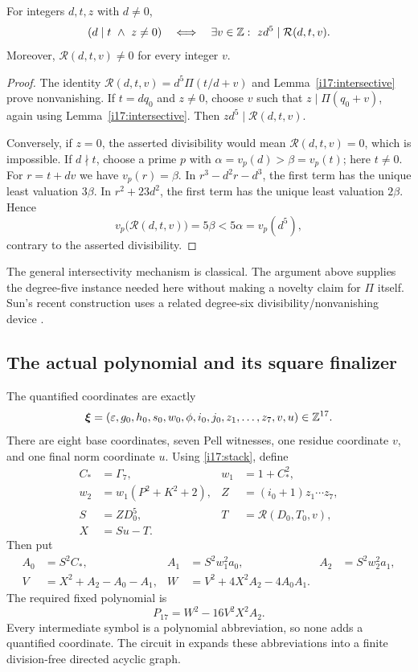 \begin{lemma}
\label{i17:merge}
For integers $d,t,z$ with $d\ne0$,
\begin{equation}
 (d\mid t\ \land\ z\ne0)
 \quad\Longleftrightarrow\quad
 \exists v\in\mathbb Z:\ zd^5\mid\mathcal R(d,t,v).
 \label{i17:merge-equivalence}
\end{equation}
Moreover, $\mathcal R(d,t,v)\ne0$ for every integer $v$.
\end{lemma}
\begin{proof}
The identity
$\mathcal R(d,t,v)=d^5\Pi(t/d+v)$ and
Lemma~\ref{i17:intersective} prove nonvanishing.
If $t=dq_0$ and $z\ne0$, choose $v$ such that
$z\mid\Pi(q_0+v)$, again using Lemma~\ref{i17:intersective}.
Then $zd^5\mid\mathcal R(d,t,v)$.

Conversely, if $z=0$, the asserted divisibility would mean
$\mathcal R(d,t,v)=0$, which is impossible.
If $d\nmid t$, choose a prime $p$ with
$\alpha=v_p(d)>\beta=v_p(t)$; here $t\ne0$.
For $r=t+dv$ we have $v_p(r)=\beta$.
In $r^3-d^2r-d^3$, the first term has the unique least valuation
$3\beta$. In $r^2+23d^2$, the first term has the unique least
valuation $2\beta$. Hence
\[
 v_p\bigl(\mathcal R(d,t,v)\bigr)
 =5\beta<5\alpha=v_p(d^5),
\]
contrary to the asserted divisibility.
\end{proof}

The general intersectivity mechanism is classical. The argument above
supplies the degree-five instance needed here without making a novelty
claim for $\Pi$ itself. Sun's recent construction uses a related
degree-six divisibility/nonvanishing device \cite[Section 5]{sun2026}.

\subsection{The actual polynomial and its square finalizer}

The quantified coordinates are exactly
\[
 \boldsymbol\xi=
 (\varepsilon,g_0,h_0,s_0,w_0,\phi,i_0,j_0,
   z_1,\ldots,z_7,v,u)\in\mathbb Z^{17}.
\]
There are eight base coordinates, seven Pell witnesses, one residue
coordinate $v$, and one final norm coordinate $u$.
Using \eqref{i17:stack}, define
\begin{align*}
 C_\ast&=\Gamma_7,& w_1&=1+C_\ast^2,\\
 w_2&=w_1(P^2+K^2+2),& Z&=(i_0+1)z_1\cdots z_7,\\
 S&=ZD_0^5,& T&=\mathcal R(D_0,T_0,v),\\
 X&=Su-T.
\end{align*}
Then put
\begin{align*}
 A_0&=S^2C_\ast,&
 A_1&=S^2w_1^2a_0,&
 A_2&=S^2w_2^2a_1,\\
 V&=X^2+A_2-A_0-A_1,&
 W&=V^2+4X^2A_2-4A_0A_1.
\end{align*}
The required fixed polynomial is
\begin{equation}
 \boxed{P_{17}=W^2-16V^2X^2A_2.}
 \label{i17:polynomial}
\end{equation}
Every intermediate symbol is a polynomial abbreviation, so none adds
a quantified coordinate. The circuit in
 expands these abbreviations into
a finite division-free directed acyclic graph.


